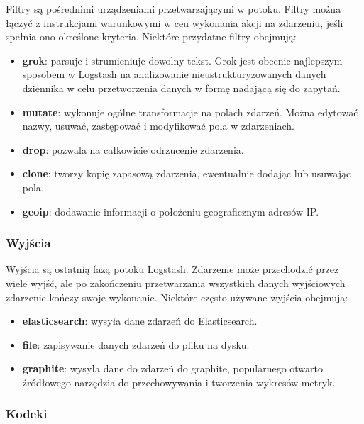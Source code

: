 Filtry są pośrednimi urządzeniami przetwarzającymi w potoku. Filtry można łączyć z instrukcjami warunkowymi w ceu wykonania akcji na zdarzeniu, jeśli spełnia ono określone kryteria. Niektóre przydatne filtry obejmują: 

\begin{itemize}
    \item \textbf{grok}: parsuje i strumieniuje dowolny tekst. Grok jest obecnie najlepszym sposobem w Logstash na analizowanie nieustrukturyzowanych danych dziennika w celu przetworzenia danych w formę nadającą się do zapytań\cite{logstashManualHowItWorks}. 
    \item \textbf{mutate}: wykonuje ogólne transformacje na polach zdarzeń. Można edytować nazwy, usuwać, zastępować i modyfikować pola w zdarzeniach.
    \item \textbf{drop}: pozwala na całkowicie odrzucenie zdarzenia\cite{logstashManualHowItWorks}.
    \item \textbf{clone}: tworzy kopię zapasową zdarzenia, ewentualnie dodając lub usuwając pola\cite{logstashManualHowItWorks}.
    \item \textbf{geoip}: dodawanie informacji o położeniu geograficznym adresów IP\cite{logstashManualHowItWorks}.
\end{itemize}

\subsubsection{Wyjścia}

Wyjścia są ostatnią fazą potoku Logstash. Zdarzenie może przechodzić przez wiele wyjść, ale po zakończeniu przetwarzania wszystkich danych wyjściowych zdarzenie kończy swoje wykonanie\cite{logstashManualHowItWorks}.
Niektóre często używane wyjścia obejmują:

\begin{itemize}
    \item \textbf{elasticsearch}: wysyła dane zdarzeń do Elasticsearch\cite{logstashManualHowItWorks}.
    \item \textbf{file}: zapisywanie danych zdarzeń do pliku na dysku\cite{logstashManualHowItWorks}.
    \item \textbf{graphite}: wysyła dane do zdarzeń do graphite, popularnego otwarto źródłowego narzędzia do przechowywania i tworzenia wykresów metryk\cite{logstashManualHowItWorks}.
\end{itemize}

\subsubsection{Kodeki}

